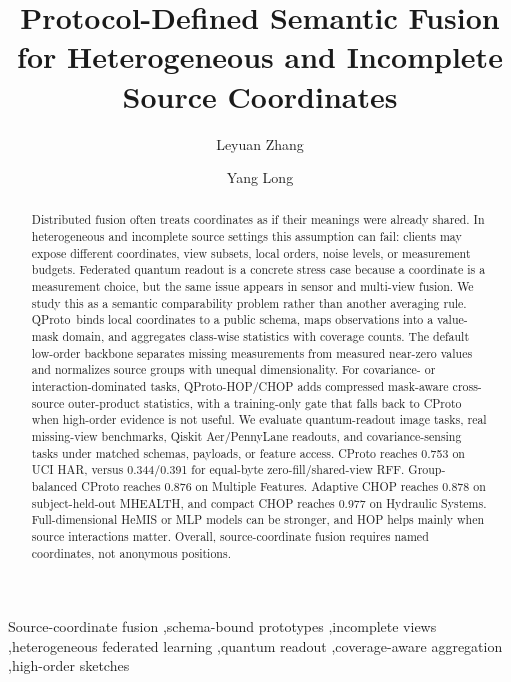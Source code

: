 \documentclass[preprint]{elsarticle}
\newcommand{\method}{QProto}
\newcommand{\hopmethod}{QProto-HOP}
\begin{document}
\begin{frontmatter}

\title{Protocol-Defined Semantic Fusion for Heterogeneous and Incomplete Source Coordinates}

\author[inst1]{Leyuan Zhang}
\author[inst1]{Yang Long}
\address[inst1]{Department of Computer Science, Durham University, Durham, United Kingdom}

\begin{abstract}
Distributed fusion often treats coordinates as if their meanings were already shared. In heterogeneous and incomplete source settings this assumption can fail: clients may expose different coordinates, view subsets, local orders, noise levels, or measurement budgets. Federated quantum readout is a concrete stress case because a coordinate is a measurement choice, but the same issue appears in sensor and multi-view fusion. We study this as a semantic comparability problem rather than another averaging rule. \method\ binds local coordinates to a public schema, maps observations into a value-mask domain, and aggregates class-wise statistics with coverage counts. The default low-order backbone separates missing measurements from measured near-zero values and normalizes source groups with unequal dimensionality. For covariance- or interaction-dominated tasks, \hopmethod/CHOP adds compressed mask-aware cross-source outer-product statistics, with a training-only gate that falls back to CProto when high-order evidence is not useful. We evaluate quantum-readout image tasks, real missing-view benchmarks, Qiskit Aer/PennyLane readouts, and covariance-sensing tasks under matched schemas, payloads, or feature access. CProto reaches 0.753 on UCI HAR, versus 0.344/0.391 for equal-byte zero-fill/shared-view RFF. Group-balanced CProto reaches 0.876 on Multiple Features. Adaptive CHOP reaches 0.878 on subject-held-out MHEALTH, and compact CHOP reaches 0.977 on Hydraulic Systems. Full-dimensional HeMIS or MLP models can be stronger, and HOP helps mainly when source interactions matter. Overall, source-coordinate fusion requires named coordinates, not anonymous positions.
\end{abstract}

\begin{keyword}
Source-coordinate fusion \sep schema-bound prototypes \sep incomplete views \sep heterogeneous federated learning \sep quantum readout \sep coverage-aware aggregation \sep high-order sketches
\end{keyword}

\end{frontmatter}
\end{document}
